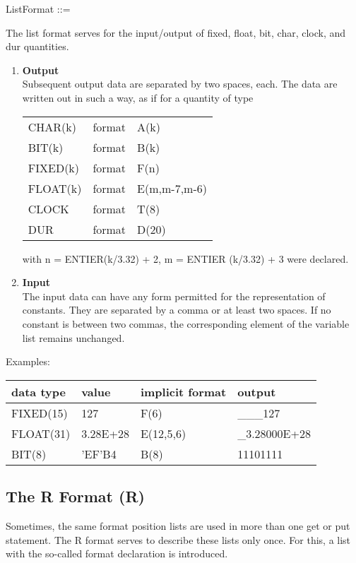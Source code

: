 ListFormat ::=\\

The list format serves for the input/output of fixed, float, bit, char,
clock, and dur quantities.
\begin{enumerate}
\item {\bf Output}\\
Subsequent output data are separated by two spaces, each. The data are
written out in such a way, as if for a quantity of type

\begin{tabular}{lll}
CHAR(k)  & format & A(k)\\
BIT(k)   & format & B(k)\\
FIXED(k) & format & F(n)\\
FLOAT(k) & format & E(m,m-7,m-6)\\
CLOCK    & format & T(8)\\
DUR      & format & D(20)
\end{tabular}

with n = ENTIER(k/3.32) + 2, m = ENTIER (k/3.32) + 3 were
declared.
\item {\bf Input}\\
The input data can have any form permitted for the representation of
constants. They are separated by a comma or at least two spaces. If no
constant is between two commas, the corresponding element of the
variable list remains unchanged.
\end{enumerate}

Examples:

\begin{tabular}{llll}
data type & value    & implicit format & output \\ \hline
FIXED(15) & 127      & F(6)            & \_\_\_127 \\
FLOAT(31) & 3.28E+28 & E(12,5,6)       & \_3.28000E+28\\
BIT(8)    & 'EF'B4   & B(8)            & 11101111
\end{tabular}

\subsection{The R Format (R)}   %
\label{sec_dation_r_format}

Sometimes, the same format position lists are used in more than one get
or put statement. The R format serves to describe these lists only
once. For this, a list with the so-called format declaration is
introduced.

